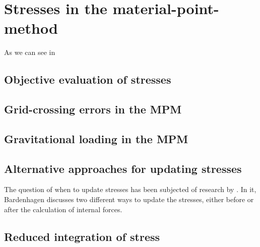 
\section{Stresses in the material-point-method}
\label{sec:stress-mater-point}

As we can see in \cite{Andersen2010} 

\subsection{Objective evaluation of stresses}
\label{sec:object-eval-stress}


\subsection{Grid-crossing errors in the MPM}
\label{sec:grid-crossing-errors}

\subsection{Gravitational loading in the MPM}
\label{sec:grav-load-mpm}


\subsection{Alternative approaches for updating stresses}
\label{sec:altern-appr-updat}

The question of when to update stresses has been subjected of research
by \cite{Bardenhagen2002}. In it, Bardenhagen discusses two different
ways to update the stresses, either before or after the calculation of
internal forces. 


\subsection{Reduced integration of stress}
\label{sec:reduc-integr-stress}



